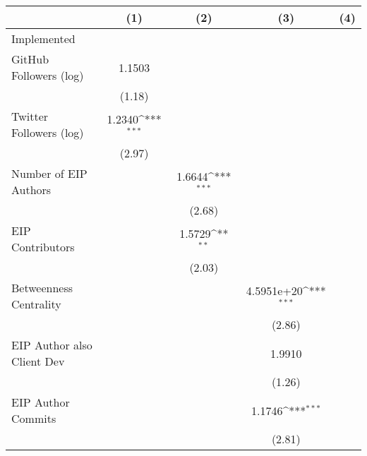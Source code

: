 {
\def\sym#1{\ifmmode^{#1}\else\(^{#1}\)\fi}
\begin{tabular}{l*{4}{c}}
\hline\hline
                                   &\multicolumn{1}{c}{(1)}         &\multicolumn{1}{c}{(2)}         &\multicolumn{1}{c}{(3)}         &\multicolumn{1}{c}{(4)}         \\
\hline
Implemented                        &                   &                   &                   &                   \\
GitHub Followers (log)             &    1.1503         &                   &                   &                   \\
                                   &    (1.18)         &                   &                   &                   \\
[1em]
Twitter Followers (log)            &    1.2340\sym{***}&                   &                   &                   \\
                                   &    (2.97)         &                   &                   &                   \\
[1em]
Number of EIP Authors              &                   &    1.6644\sym{***}&                   &                   \\
                                   &                   &    (2.68)         &                   &                   \\
[1em]
EIP Contributors                   &                   &    1.5729\sym{**} &                   &                   \\
                                   &                   &    (2.03)         &                   &                   \\
[1em]
Betweenness Centrality             &                   &                   &4.5951e+20\sym{***}&                   \\
                                   &                   &                   &    (2.86)         &                   \\
[1em]
EIP Author also Client Dev         &                   &                   &    1.9910         &                   \\
                                   &                   &                   &    (1.26)         &                   \\
[1em]
EIP Author Commits                 &                   &                   &    1.1746\sym{***}&                   \\
                                   &                   &                   &    (2.81)         &                   \\

\end{tabular}}

